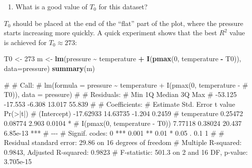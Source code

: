 \documentclass[
  a4paper,
]{article}
\newenvironment{Shaded}{\begin{snugshade}}{\end{snugshade}}
\newcommand{\AttributeTok}[1]{\textcolor[rgb]{0.13,0.29,0.53}{#1}}
\newcommand{\DecValTok}[1]{\textcolor[rgb]{0.00,0.00,0.81}{#1}}
\newcommand{\FunctionTok}[1]{\textcolor[rgb]{0.13,0.29,0.53}{\textbf{#1}}}
\newcommand{\NormalTok}[1]{#1}
\newcommand{\OtherTok}[1]{\textcolor[rgb]{0.56,0.35,0.01}{#1}}
\newcommand{\SpecialCharTok}[1]{\textcolor[rgb]{0.81,0.36,0.00}{\textbf{#1}}}
\providecommand{\tightlist}{%
  \setlength{\itemsep}{0pt}\setlength{\parskip}{0pt}}
\theoremstyle{definition}
\theoremstyle{definition}
\theoremstyle{definition}
\theoremstyle{definition}
\theoremstyle{remark}
\begin{document}
\begin{enumerate}
\def\labelenumi{\alph{enumi}.}
\setcounter{enumi}{2}
\tightlist
\item
  What is a good value of \(T_0\) for this dataset?
\end{enumerate}

\begin{myanswers}
\(T_0\) should be placed at the end of the ``flat'' part
of the plot, where the pressure starts increasing more
quickly. A quick experiment shows that the best \(R^2\)
value is achieved for \(T_0 \approx 273\):

\begin{Shaded}
\begin{Highlighting}[]
\NormalTok{T0 }\OtherTok{\textless{}{-}} \DecValTok{273}
\NormalTok{m }\OtherTok{\textless{}{-}} \FunctionTok{lm}\NormalTok{(pressure }\SpecialCharTok{\textasciitilde{}}\NormalTok{ temperature }\SpecialCharTok{+} \FunctionTok{I}\NormalTok{(}\FunctionTok{pmax}\NormalTok{(}\DecValTok{0}\NormalTok{, temperature }\SpecialCharTok{{-}}\NormalTok{ T0)),}
        \AttributeTok{data=}\NormalTok{pressure)}
\FunctionTok{summary}\NormalTok{(m)}
\end{Highlighting}
\end{Shaded}

\begin{Shaded}
\begin{Highlighting}[]
\NormalTok{\# }
\NormalTok{\# Call:}
\NormalTok{\# lm(formula = pressure \textasciitilde{} temperature + I(pmax(0, temperature {-} }
\NormalTok{\#     T0)), data = pressure)}
\NormalTok{\# }
\NormalTok{\# Residuals:}
\NormalTok{\#     Min      1Q  Median      3Q     Max }
\NormalTok{\# {-}53.125 {-}17.553  {-}6.308  13.017  55.839 }
\NormalTok{\# }
\NormalTok{\# Coefficients:}
\NormalTok{\#                               Estimate Std. Error t value Pr(\textgreater{}|t|)    }
\NormalTok{\# (Intercept)                  {-}17.62933   14.63735  {-}1.204   0.2459    }
\NormalTok{\# temperature                    0.25472    0.08774   2.903   0.0104 *  }
\NormalTok{\# I(pmax(0, temperature {-} T0))   7.77118    0.38024  20.437 6.85e{-}13 ***}
\NormalTok{\# {-}{-}{-}}
\NormalTok{\# Signif. codes:  0 \textquotesingle{}***\textquotesingle{} 0.001 \textquotesingle{}**\textquotesingle{} 0.01 \textquotesingle{}*\textquotesingle{} 0.05 \textquotesingle{}.\textquotesingle{} 0.1 \textquotesingle{} \textquotesingle{} 1}
\NormalTok{\# }
\NormalTok{\# Residual standard error: 29.86 on 16 degrees of freedom}
\NormalTok{\# Multiple R{-}squared:  0.9843,  Adjusted R{-}squared:  0.9823 }
\NormalTok{\# F{-}statistic: 501.3 on 2 and 16 DF,  p{-}value: 3.705e{-}15}
\end{Highlighting}
\end{Shaded}


\end{myanswers}
\end{document}
